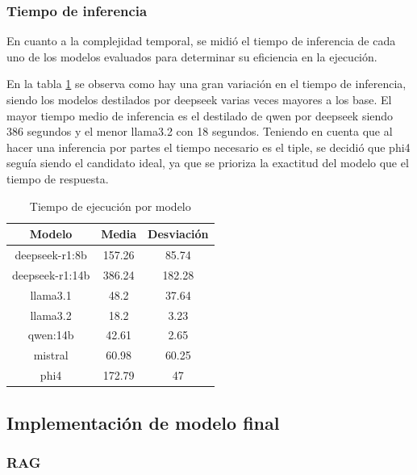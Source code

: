 \documentclass[../main.tex]{subfiles}
\begin{document}
\subsubsection{Tiempo de inferencia}

En cuanto a la complejidad temporal, se midió el tiempo de inferencia de cada uno de los modelos evaluados para determinar su eficiencia en la ejecución.

En la tabla \ref{tab:modelos_tiempo} se observa como hay una gran variación en el tiempo de inferencia, siendo los modelos destilados por deepseek varias veces mayores a los base. El mayor tiempo medio de inferencia es el destilado de qwen por deepseek siendo 386 segundos y el menor llama3.2 con 18 segundos.
Teniendo en cuenta que al hacer una inferencia por partes el tiempo necesario es el tiple, se decidió que phi4 seguía siendo el candidato ideal, ya que se prioriza la exactitud del modelo que el tiempo de respuesta.

\begin{table}[H]
    \centering
    \caption{Tiempo de ejecución por modelo}
    \label{tab:modelos_tiempo}
    \renewcommand{\arraystretch}{1.2}
    \begin{tabular}{ccc}
        \hline
        \textbf{Modelo} & \textbf{Media} & \textbf{Desviación} \\
        \hline
        deepseek-r1:8b & 157.26 & 85.74 \\
        deepseek-r1:14b & 386.24 & 182.28 \\
        llama3.1 & 48.2 & 37.64 \\
        llama3.2 & 18.2 & 3.23 \\
        qwen:14b & 42.61 & 2.65 \\
        mistral & 60.98 & 60.25 \\
        phi4 & 172.79 & 47 \\
        
        \hline
    \end{tabular}

\end{table}


\subsection{Implementación de modelo final}
\subsubsection{RAG}
\end{document}
